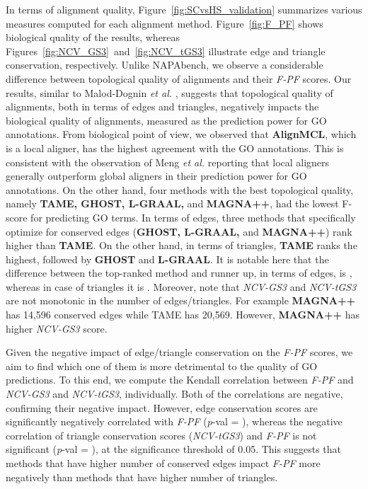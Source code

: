 \documentclass[10pt, journal, compsoc, final]{IEEEtran}
\begin{document}
In terms of alignment quality, Figure~\ref{fig:SCvsHS_validation} summarizes various measures computed for each alignment 
method. Figure~\ref{fig:F_PF} shows biological quality of the results, whereas Figures~\ref{fig:NCV_GS3}~and~\ref{fig:NCV_tGS3} illustrate edge and triangle conservation, respectively. Unlike NAPAbench, we observe a considerable difference between topological quality of alignments and their \textit{F-PF} scores. Our results, similar to Malod-Dognin \textit{et al.} \cite{L-GRAAL}, suggests that topological quality of alignments, both in terms of edges and triangles, negatively impacts the biological quality of alignments, measured as the prediction power for GO annotations. From biological point of view, we observed that \textbf{AlignMCL}, which is a local aligner, has the highest agreement with the GO annotations. This is consistent with the observation of Meng \textit{et al.} \cite{Meng2015} reporting that local aligners generally outperform global aligners in their prediction power for GO annotations. On the other hand, four methods with the best topological quality, namely \textbf{TAME, GHOST, L-GRAAL,} and \textbf{MAGNA++}, had the lowest F-score for predicting GO terms. 
In terms of edges, three methods that specifically optimize for conserved edges (\textbf{GHOST, L-GRAAL,} and \textbf{MAGNA++}) rank higher than \textbf{TAME}. On the other hand, in terms of triangles, \textbf{TAME} ranks the highest, followed by \textbf{GHOST} and \textbf{L-GRAAL}. It is notable here that the difference between the top-ranked method and runner up, in terms of edges, is , whereas in case of triangles it is . Moreover, note that \textit{NCV-GS3} and \textit{NCV-tGS3} are not monotonic in the number of edges/triangles. For example \textbf{MAGNA++} has 14,596 conserved edges while TAME has 20,569. However, \textbf{MAGNA++} has higher \textit{NCV-GS3} score.


Given the negative impact of edge/triangle conservation on the \textit{F-PF} scores, we aim to find which one of them is more detrimental to the quality of GO predictions. To this end, we compute the Kendall correlation between \textit{F-PF} and \textit{NCV-GS3} and \textit{NCV-tGS3}, individually. Both of the correlations are negative, confirming their negative impact. However, edge conservation scores  are significantly negatively correlated with \textit{F-PF} (\emph{p}-val = ), whereas the negative correlation of triangle conservation scores (\textit{NCV-tGS3}) and \textit{F-PF} is not significant (\emph{p}-val = ), at the significance threshold of 0.05. This suggests that methods that have higher number of conserved edges impact \textit{F-PF} more negatively than methods that have higher number of triangles. 
\end{document}

